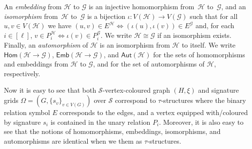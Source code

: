 \documentclass[authorcolumns,numberwithinsect]{no-lipics-v2022}
\newcommand{\homs}[2]{\mathsf{Hom}(#1 \to #2)}
\newcommand{\embs}[2]{\mathsf{Emb}(#1 \to #2)}
\newcommand{\auts}{\mathsf{Aut}}
\begin{document}
An \emph{embedding} from $\mathcal{H}$ to $\mathcal{G}$ is an injective homomorphism from~$\mathcal{H}$ to~$\mathcal{G}$, and an \emph{isomorphism} from~$\mathcal{H}$ to~$\mathcal{G}$ is a bijection $\iota:V(\mathcal{H})\to V(\mathcal{G})$ such that for all $u,v\in V(\mathcal{H})$ we have $(u,v)\in E^\mathcal{H} \Leftrightarrow (\iota(u),\iota(v))\in E^\mathcal{G}$ and, for each $i\in[\ell]$, $v\in P_i^\mathcal{H}\Leftrightarrow \iota(v)\in P_i^\mathcal{G}$. We write $\mathcal{H}\cong\mathcal{G}$ if an isomorphism exists. Finally, an \emph{automorphism} of $\mathcal{H}$ is an isomorphism from $\mathcal{H}$ to itself. We write $\homs{\mathcal{H}}{\mathcal{G}}$, $\embs{\mathcal{H}}{\mathcal{G}}$, and $\auts(\mathcal{H})$ for the sets of homomorphisms and embeddings from $\mathcal{H}$ to $\mathcal{G}$, and for the set of automorphisms of $\mathcal{H}$, respectively.

Now it is easy to see that both $\mathcal{S}$-vertex-coloured graph $(H,\xi)$ and signature grids $\Omega=(G,\{s_v\}_{v\in V(G)})$ over $\mathcal{S}$ correspond to $\tau$-structures where the binary relation symbol $E$ corresponds to the edges, and a vertex equipped with/coloured by signature $s_i$ is contained in the unary relation $P_i$. Moreover, it is also easy to see that the notions of homomorphisms, embeddings, isomorphisms, and automorphisms are identical when we them as $\tau$-structures.
\end{document}
